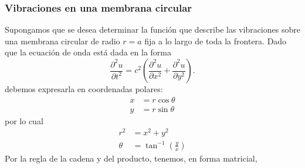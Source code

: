 \documentclass[11pt,letterpaper,draft]{report}
\theoremstyle{plain}
\theoremstyle{definition}
\theoremstyle{remark}
\newcommand\<{\langle}
\renewcommand\>{\rangle}
\begin{document}
\subsubsection{Vibraciones en una membrana circular}
Supongamos que se desea determinar la función que describe las
vibraciones sobre una membrana circular de radio $r=a$ fija a lo largo
de toda la frontera.
Dado que la ecuación de onda está dada en la forma
\[
  \frac{\partial^{2} u}{\partial t^{2}}
  = c^{2} \left(
    \frac{\partial ^{2}u}{\partial x^{2}}
    +\frac{\partial ^{2}u}{\partial y^{2}}
  \right)
.\]
debemos expresarla en coordenadas polares:
\begin{align*}
  x &= r\cos\theta \\
  y &= r\sin\theta
\end{align*}
por lo cual
\begin{align*}
  r^2 &= x^{2}+y^{2} \\
  \theta &= \tan^{-1}(\tfrac{y}{x})
\end{align*}
Por la regla de la cadena y del producto, tenemos, en forma matricial,
\end{document}
